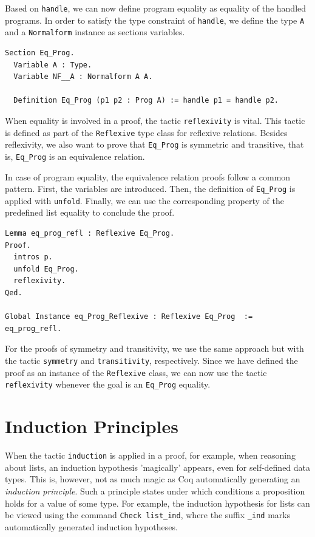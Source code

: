 \documentclass[a4paper, 11pt, fleqn, twoside, abstract=on]{scrreprt}
\newcommand{\cinl}[1]{\texttt{#1}}
\begin{document}
Based on \cinl{handle}, we can now define program equality as equality of the handled programs.
In order to satisfy the type constraint of \cinl{handle}, we define the type \cinl{A} and a \cinl{Normalform} instance as sections variables.

\begin{verbatim}
Section Eq_Prog.
  Variable A : Type.
  Variable NF__A : Normalform A A.

  Definition Eq_Prog (p1 p2 : Prog A) := handle p1 = handle p2.
\end{verbatim}

When equality is involved in a proof, the tactic \cinl{reflexivity} is vital.
This tactic is defined as part of the \cinl{Reflexive} type class for reflexive relations.
Besides reflexivity, we also want to prove that \cinl{Eq_Prog} is symmetric and transitive, that is, \cinl{Eq_Prog} is an equivalence relation.

In case of program equality, the equivalence relation proofs follow a common pattern.
First, the variables are introduced.
Then, the definition of \cinl{Eq_Prog} is applied with \cinl{unfold}.
Finally, we can use the corresponding property of the predefined list equality to conclude the proof.

\begin{verbatim}
Lemma eq_prog_refl : Reflexive Eq_Prog.
Proof. 
  intros p.
  unfold Eq_Prog.
  reflexivity.
Qed.

Global Instance eq_Prog_Reflexive : Reflexive Eq_Prog  := eq_prog_refl.
\end{verbatim}

For the proofs of symmetry and transitivity, we use the same approach but with the tactic \cinl{symmetry} and \cinl{transitivity}, respectively.
Since we have defined the proof as an instance of the \cinl{Reflexive} class, we can now use the tactic \cinl{reflexivity} whenever the goal is an \cinl{Eq_Prog} equality.

\section{Induction Principles}

When the tactic \cinl{induction} is applied in a proof, for example, when reasoning about lists, an induction hypothesis 'magically' appears, even for self-defined data types.
This is, however, not as much magic as Coq automatically generating an \textit{induction principle}.
Such a principle states under which conditions a proposition holds for a value of some type.
For example, the induction hypothesis for lists can be viewed using the command \cinl{Check list_ind}, where the suffix \cinl{_ind} marks automatically generated induction hypotheses.
\end{document}
